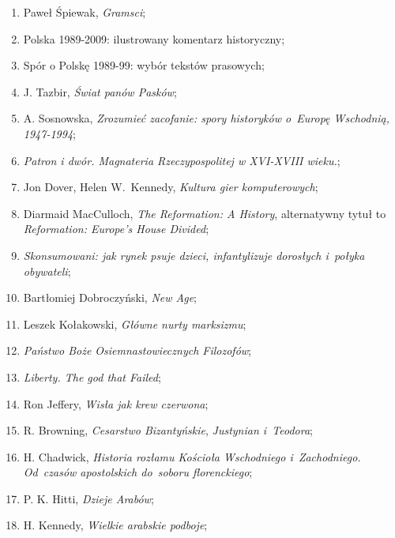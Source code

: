 \documentclass[a4paper,11pt]{article}
\begin{document}
\begin{enumerate}
\item Paweł Śpiewak, \emph{Gramsci};

\item Polska 1989-2009: ilustrowany komentarz historyczny;

\item Spór o Polskę 1989-99: wybór tekstów prasowych;

\item J. Tazbir, \emph{Świat panów Pasków};

\item A. Sosnowska, \emph{Zrozumieć zacofanie: spory historyków
    o~Europę Wschodnią, 1947-1994};

\item \emph{Patron i dwór. Magnateria Rzeczypospolitej w XVI-XVIII
    wieku.};

\item Jon Dover, Helen W.~Kennedy, \emph{Kultura gier komputerowych};

\item Diarmaid MacCulloch, \emph{The Reformation: A History},
  alternatywny tytuł to \emph{Reformation: Europe's House Divided};

\item \emph{Skonsumowani: jak rynek psuje dzieci, infantylizuje
    dorosłych i~połyka obywateli};

\item Bartłomiej Dobroczyński, \emph{New Age};

\item Leszek Kołakowski, \emph{Główne nurty marksizmu};

\item \emph{Państwo Boże Osiemnastowiecznych Filozofów};

\item \emph{Liberty. The god that Failed};

\item Ron Jeffery, \emph{Wisła jak krew czerwona};

\item R. Browning, \emph{Cesarstwo Bizantyńskie}, \emph{Justynian
    i~Teodora};

\item H. Chadwick, \emph{Historia rozłamu Kościoła Wschodniego
    i~Zachodniego. Od~czasów apostolskich do~soboru florenckiego};

\item P. K. Hitti, \emph{Dzieje Arabów};

\item H. Kennedy, \emph{Wielkie arabskie podboje};


\end{enumerate}
\end{document}
